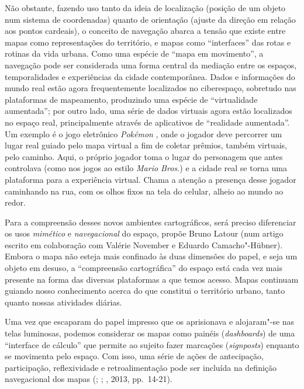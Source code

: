 Não obstante, fazendo uso tanto da ideia de localização (posição de um objeto num sistema de coordenadas) quanto de orientação (ajuste da direção em relação aos pontos cardeais), o conceito de navegação abarca a tensão que existe
entre mapas como representações do território, e mapas como
``interfaces'' das rotas e rotinas da vida urbana. Como uma espécie de ``mapa em movimento'', a navegação pode ser
considerada uma forma central da mediação entre os espaços,
temporalidades e experiências da cidade contemporânea. Dados e informações do mundo
real estão agora frequentemente localizados no ciberespaço, sobretudo
nas plataformas de mapeamento, produzindo uma espécie de ``virtualidade
aumentada''; por outro lado, uma série de dados virtuais agora estão
localizados no espaço real, principalmente através de aplicativos de
``realidade aumentada''. Um exemplo é o jogo eletrônico \emph{Pokémon
}, onde o jogador deve percorrer um lugar real guiado pelo mapa
virtual a fim de coletar prêmios, também virtuais, pelo caminho. Aqui, o
próprio jogador toma o lugar do personagem que antes controlava (como
nos jogos ao estilo \emph{Mario Bros.}) e a cidade real se torna uma
plataforma para a experiência virtual. Chama a atenção a presença desse
jogador caminhando na rua, com os olhos fixos na tela do celular, alheio
ao mundo ao redor.

Para a compreensão desses novos ambientes cartográficos, será preciso
diferenciar os usos \emph{mimético} e \emph{navegacional} do espaço,
propõe Bruno Latour (num artigo escrito em colaboração com Valérie
November e Eduardo Camacho"-Hübner). Embora o mapa não esteja mais
confinado às duas dimensões do papel, e seja um objeto em desuso, a
``compreensão cartográfica'' do espaço está cada vez mais presente na
forma das diversas plataformas a que temos acesso. Mapas continuam
guiando nosso conhecimento acerca do que constitui o território urbano,
tanto quanto nossas atividades diárias.

Uma vez que escaparam do papel impresso que os aprisionava e alojaram"-se
nas telas luminosas, podemos considerar os mapas como painéis
(\emph{dashboards}) de uma ``interface de cálculo'' que permite ao
sujeito fazer marcações (\emph{signposts}) enquanto se movimenta pelo
espaço. Com isso, uma série de ações de antecipação, participação,
reflexividade e retroalimentação pode ser incluída na definição
navegacional dos mapas (; ; , 2013, pp.~14-21).

